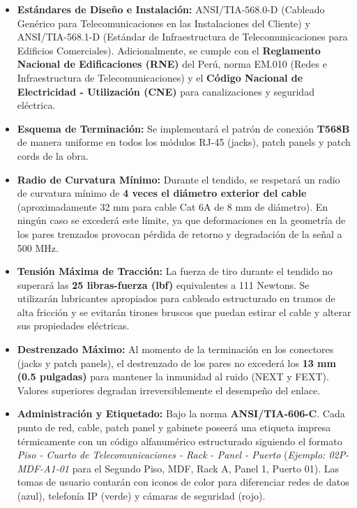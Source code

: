 \begin{itemize}
    \item \textbf{Estándares de Diseño e Instalación:} ANSI/TIA-568.0-D (Cableado Genérico para Telecomunicaciones en las Instalaciones del Cliente) y ANSI/TIA-568.1-D (Estándar de Infraestructura de Telecomunicaciones para Edificios Comerciales). Adicionalmente, se cumple con el \textbf{Reglamento Nacional de Edificaciones (RNE)} del Perú, norma EM.010 (Redes e Infraestructura de Telecomunicaciones) y el \textbf{Código Nacional de Electricidad - Utilización (CNE)} para canalizaciones y seguridad eléctrica.
    \item \textbf{Esquema de Terminación:} Se implementará el patrón de conexión \textbf{T568B} de manera uniforme en todos los módulos RJ-45 (jacks), patch panels y patch cords de la obra.
    \item \textbf{Radio de Curvatura Mínimo:} Durante el tendido, se respetará un radio de curvatura mínimo de \textbf{4 veces el diámetro exterior del cable} (aproximadamente 32 mm para cable Cat 6A de 8 mm de diámetro). En ningún caso se excederá este límite, ya que deformaciones en la geometría de los pares trenzados provocan pérdida de retorno y degradación de la señal a 500 MHz.
    \item \textbf{Tensión Máxima de Tracción:} La fuerza de tiro durante el tendido no superará las \textbf{25 libras-fuerza (lbf)} equivalentes a 111 Newtons. Se utilizarán lubricantes apropiados para cableado estructurado en tramos de alta fricción y se evitarán tirones bruscos que puedan estirar el cable y alterar sus propiedades eléctricas.
    \item \textbf{Destrenzado Máximo:} Al momento de la terminación en los conectores (jacks y patch panels), el destrenzado de los pares no excederá los \textbf{13 mm (0.5 pulgadas)} para mantener la inmunidad al ruido (NEXT y FEXT). Valores superiores degradan irreversiblemente el desempeño del enlace.
    \item \textbf{Administración y Etiquetado:} Bajo la norma \textbf{ANSI/TIA-606-C}. Cada punto de red, cable, patch panel y gabinete poseerá una etiqueta impresa térmicamente con un código alfanumérico estructurado siguiendo el formato \textit{Piso - Cuarto de Telecomunicaciones - Rack - Panel - Puerto} (\textit{Ejemplo: 02P-MDF-A1-01} para el Segundo Piso, MDF, Rack A, Panel 1, Puerto 01). Las tomas de usuario contarán con iconos de color para diferenciar redes de datos (azul), telefonía IP (verde) y cámaras de seguridad (rojo).
\end{itemize}

